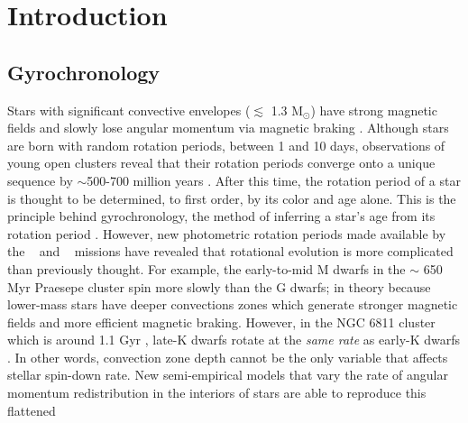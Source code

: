 \section{Introduction}

\subsection{Gyrochronology}

Stars with significant convective envelopes ($\lesssim$ 1.3 M$_\odot$) have
strong magnetic fields and slowly lose angular momentum via magnetic braking
\citep[\eg][]{schatzman1962, weber1967, skumanich1972, kawaler1988,
pinsonneault1989}.
Although stars are born with random rotation periods, between 1 and 10 days,
observations of young open clusters reveal that their rotation periods
converge onto a unique sequence by $\sim$500-700 million years
\citep[\eg][]{irwin2009, gallet2013}.
After this time, the rotation period of a star is thought to be determined, to
first order, by its color and age alone.
This is the principle behind gyrochronology, the method of inferring a
star’s age from its rotation period \citep[\eg][]{barnes2003, barnes2007,
barnes2010, meibom2011, meibom2015}.
However, new photometric rotation periods made available by the \kepler\
\citep{borucki2010} and \ktwo\ \citep{howell2014} missions
\citep[\eg][]{mcquillan2014, garcia2014, douglas2017, rebull2017, meibom2011,
meibom2015, curtis2019} have revealed that rotational evolution is more
complicated than previously thought.
For example, the early-to-mid M dwarfs in the $\sim$ 650 Myr Praesepe cluster
spin more slowly than the G dwarfs; in theory because lower-mass stars have
deeper convections zones which generate stronger magnetic fields and more
efficient magnetic braking.
However, in the NGC 6811 cluster which is around 1.1 Gyr \citep{janes2011},
late-K dwarfs rotate at the {\it same rate} as early-K dwarfs
\citep{curtis2019}.
In other words, convection zone depth cannot be the only variable that affects
stellar spin-down rate.
New semi-empirical models that vary the rate of angular momentum
redistribution in the interiors of stars are able to reproduce this flattened
